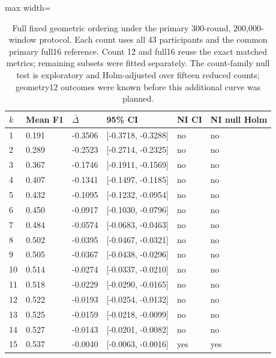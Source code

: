 \begin{table}[htbp]
\centering\small
\caption{Full fixed geometric ordering under the primary 300-round, 200,000-window protocol. Each count uses all 43 participants and the common primary full16 reference. Count 12 and full16 reuse the exact matched metrics; remaining subsets were fitted separately. The count-family null test is exploratory and Holm-adjusted over fifteen reduced counts; geometry12 outcomes were known before this additional curve was planned.}\label{tab:geometriccurve}
\begin{adjustbox}{max width=\textwidth}
\begin{tabular}{llllll}\toprule
$k$ & Mean F1 & $\bar\Delta$ & 95\% CI & NI CI & NI null Holm\\\midrule
1 & 0.191 & -0.3506 & [-0.3718, -0.3288] & no & no\\
2 & 0.289 & -0.2523 & [-0.2714, -0.2325] & no & no\\
3 & 0.367 & -0.1746 & [-0.1911, -0.1569] & no & no\\
4 & 0.407 & -0.1341 & [-0.1497, -0.1185] & no & no\\
5 & 0.432 & -0.1095 & [-0.1232, -0.0954] & no & no\\
6 & 0.450 & -0.0917 & [-0.1030, -0.0796] & no & no\\
7 & 0.484 & -0.0574 & [-0.0683, -0.0463] & no & no\\
8 & 0.502 & -0.0395 & [-0.0467, -0.0321] & no & no\\
9 & 0.505 & -0.0367 & [-0.0438, -0.0296] & no & no\\
10 & 0.514 & -0.0274 & [-0.0337, -0.0210] & no & no\\
11 & 0.518 & -0.0229 & [-0.0290, -0.0165] & no & no\\
12 & 0.522 & -0.0193 & [-0.0254, -0.0132] & no & no\\
13 & 0.525 & -0.0159 & [-0.0218, -0.0099] & no & no\\
14 & 0.527 & -0.0143 & [-0.0201, -0.0082] & no & no\\
15 & 0.537 & -0.0040 & [-0.0063, -0.0016] & yes & yes\\
\bottomrule\end{tabular}
\end{adjustbox}
\end{table}
